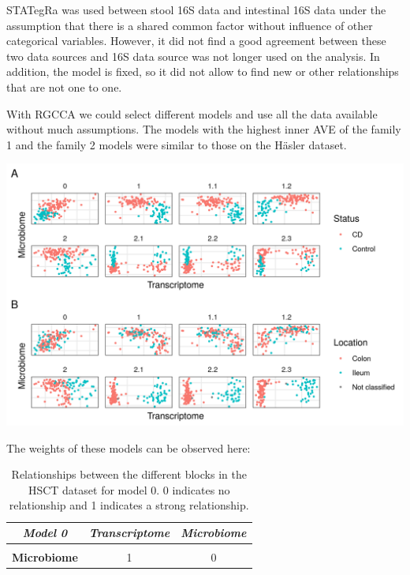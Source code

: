 \documentclass[
  12pt,
  a4paper,
  twoside,
  openright]{book}
\let\origfigure\figure
\let\endorigfigure\endfigure
\renewenvironment{figure}[1][2] {
    \expandafter\origfigure\expandafter[!htp]
} {
    \endorigfigure
}
\begin{document}
STATegRa was used between stool 16S data and intestinal 16S data under the assumption that there is a shared common factor without influence of other categorical variables.
However, it did not find a good agreement between these two data sources and 16S data source was not longer used on the analysis.
In addition, the model is fixed, so it did not allow to find new or other relationships that are not one to one.

With RGCCA we could select different models and use all the data available without much assumptions.
The models with the highest inner AVE of the family 1 and the family 2 models were similar to those on the Häsler dataset.

\begin{figure}
\includegraphics[width=1\linewidth]{images/hsct-models} \caption[Models in the HSCT dataset.]{Models in the HSCT dataset. On the abscissa the transcriptome, on the ordinate the Microbiome. Each square represents a different model of the HSCT dataset. On panel A colored by disease status, on panel B colored by sample location. Model 0 has only transcriptome and microbiome data, models 1 to 1.2 with data about the samples and models 2.1 to 2.3 with data about the samples split in 3 blocks.}\label{fig:hsct-models}
\end{figure}

The weights of these models can be observed here:

\begin{table}[H]

\caption[Model 0 of the HSCT dataset.]{\label{tab:hsct-model0}Relationships between the different blocks in the HSCT dataset for model 0. 0 indicates no relationship and 1 indicates a strong relationship.}
\centering
\begin{tabular}[t]{|>{}c|c|>{}c|}
\hline
\em{\textbf{Model 0}} & \em{\textbf{Transcriptome}} & \em{\textbf{Microbiome}}\\
\hline
\textbf{\cellcolor{gray!6}{Transcriptome}} & \cellcolor{gray!6}{0} & \cellcolor{gray!6}{1}\\
\hline
\textbf{Microbiome} & 1 & 0\\
\hline
\end{tabular}
\end{table}
\end{document}
